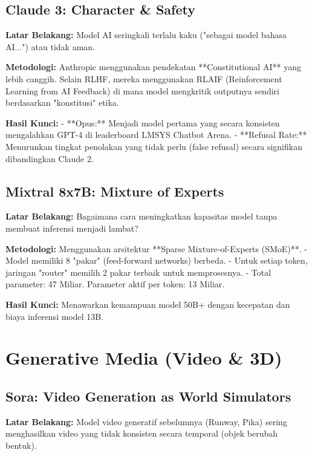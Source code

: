 \subsection{Claude 3: Character \& Safety \cite{anthropic2024claude3}}

\textbf{Latar Belakang:}
Model AI seringkali terlalu kaku ("sebagai model bahasa AI...") atau tidak aman.

\textbf{Metodologi:}
Anthropic menggunakan pendekatan **Constitutional AI** yang lebih canggih. Selain RLHF, mereka menggunakan RLAIF (Reinforcement Learning from AI Feedback) di mana model mengkritik outputnya sendiri berdasarkan "konstitusi" etika.

\textbf{Hasil Kunci:}
- **Opus:** Menjadi model pertama yang secara konsisten mengalahkan GPT-4 di leaderboard LMSYS Chatbot Arena.
- **Refusal Rate:** Menurunkan tingkat penolakan yang tidak perlu (false refusal) secara signifikan dibandingkan Claude 2.

\subsection{Mixtral 8x7B: Mixture of Experts \cite{jiang2024mixtral}}

\textbf{Latar Belakang:}
Bagaimana cara meningkatkan kapasitas model tanpa membuat inferensi menjadi lambat?

\textbf{Metodologi:}
Menggunakan arsitektur **Sparse Mixture-of-Experts (SMoE)**.
- Model memiliki 8 "pakar" (feed-forward networks) berbeda.
- Untuk setiap token, jaringan "router" memilih 2 pakar terbaik untuk memprosesnya.
- Total parameter: 47 Miliar. Parameter aktif per token: 13 Miliar.

\textbf{Hasil Kunci:}
Menawarkan kemampuan model 50B+ dengan kecepatan dan biaya inferensi model 13B.

\section{Generative Media (Video \& 3D)}

\subsection{Sora: Video Generation as World Simulators \cite{openai2024sora}}

\textbf{Latar Belakang:}
Model video generatif sebelumnya (Runway, Pika) sering menghasilkan video yang tidak konsisten secara temporal (objek berubah bentuk).

